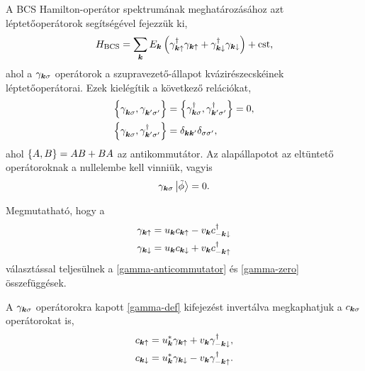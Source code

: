 \documentclass[a4paper,12pt,titlepage]{article}
\newcommand{\KK}{{\vb*{k}}}
\newcommand{\phantomdagger}{{\phantom{\dagger}}}
\begin{document}
A BCS Hamilton-operátor spektrumának meghatározásához azt léptetőoperátorok segítségével fejezzük ki,
\begin{equation} \label{H-BCS}
	H_\text{BCS} = \sum\limits_\KK E_\KK \left( \gamma_{\KK \uparrow}^\dagger \gamma_{\KK \uparrow} + \gamma_{\KK \downarrow}^\dagger \gamma_{\KK \downarrow} \right) + \text{cst},
\end{equation}
ahol a $\gamma_{\KK \sigma}$ operátorok a szupravezető-állapot kvázirészecskéinek léptetőoperátorai.  Ezek kielégítik a következő relációkat,
\begin{equation} \label{gamma-anticommutator}
\begin{split}
	\anticommutator{\gamma_{\KK \sigma}^\phantomdagger}{\gamma_{\KK^\prime \sigma^\prime}^\phantomdagger} & = \anticommutator{\gamma_{\KK \sigma}^\dagger}{\gamma_{\KK^\prime \sigma^\prime}^\dagger} = 0, \\
	\anticommutator{\gamma_{\KK \sigma}^\phantomdagger}{\gamma_{\KK^\prime \sigma^\prime}^\dagger} & = \delta_{\KK \KK^\prime} \delta_{\sigma \sigma^\prime},
\end{split}
\end{equation}
ahol $\anticommutator{A}{B} = AB + BA$ az antikommutátor.  Az alapállapotot az eltüntető operátoroknak a nullelembe kell vinniük, vagyis
\begin{equation} \label{gamma-zero}
	\gamma_{\KK \sigma} \ket{\tilde{\phi}} = 0.
\end{equation}

Megmutatható, hogy a
\begin{equation} \label{gamma-def}
\begin{split}
	\gamma_{\KK \uparrow} & = u_\KK c_{\KK \uparrow} - v_\KK c_{-\KK \downarrow}^\dagger \\
	\gamma_{\KK \downarrow} & = u_\KK c_{\KK \downarrow} + v_\KK c_{-\KK \uparrow}^\dagger
\end{split}
\end{equation}
választással teljesülnek a \eqref{gamma-anticommutator} és \eqref{gamma-zero} összefüggések.

A $\gamma_{\KK \sigma}$ operátorokra kapott \eqref{gamma-def} kifejezést invertálva megkaphatjuk a $c_{\KK \sigma}$ operátorokat is,
\begin{equation}
\begin{split}
	c_{\KK \uparrow} & = u_\KK^* \gamma_{\KK \uparrow} + v_\KK \gamma_{-\KK \downarrow}^\dagger, \\
	c_{\KK \downarrow} & = u_\KK^* \gamma_{\KK \downarrow} - v_\KK \gamma_{-\KK \uparrow}^\dagger.
\end{split}
\end{equation}
\end{document}
